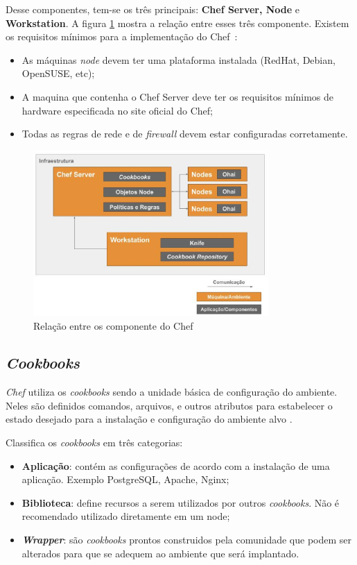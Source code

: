 Desse componentes, tem-se os três principais: \textbf{Chef Server, Node} e \textbf{Workstation}.
A figura \ref{fig:chef-comp} mostra a relação entre esses três componente. Existem os requisitos
mínimos para a implementação do Chef~\cite{chefdoc:2016}:

\begin{itemize}
  \item As máquinas \textit{node} devem ter uma plataforma instalada (RedHat,
    Debian, OpenSUSE, etc);
  \item A maquina que contenha o Chef Server deve ter os requisitos
    mínimos de hardware especificada no site oficial do Chef;
  \item Todas as regras de rede e de \textit{firewall} devem estar configuradas
    corretamente.
\end{itemize}

\begin{figure}[H]
  \centering
  \includegraphics[width=0.8\textwidth]{figuras/chef-comp.eps}
  \caption{Relação entre os componente do Chef}
  \label{fig:chef-comp}
\end{figure}

\subsection{\textit{Cookbooks}}
\label{sec:chef-cookbooks}

\textit{Chef} utiliza os \textit{cookbooks} sendo a unidade básica de configuração do
ambiente. Neles são definidos comandos, arquivos, e outros atributos
para estabelecer o estado desejado para a instalação e configuração
do ambiente alvo \cite{sharma:2015}.

 Classifica os \textit{cookbooks} em três categorias:
\begin{itemize}
  \item \textbf{Aplicação}: contém as configurações de acordo com a instalação de
    uma aplicação. Exemplo PostgreSQL, Apache, Nginx;
  \item \textbf{Biblioteca}: define recursos a serem utilizados por outros \textit{cookbooks}.
    Não é recomendado utilizado diretamente em um node;
  \item \textbf{\textit{Wrapper}}: são \textit{cookbooks} prontos construidos pela comunidade que podem
    ser alterados para que se adequem ao ambiente que será implantado.
\end{itemize}

